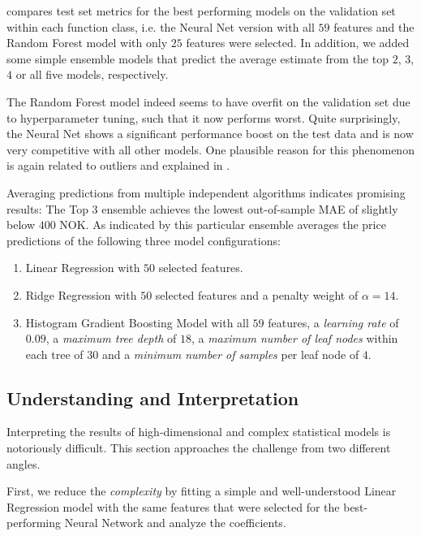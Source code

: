  compares test set metrics for the best performing models on the validation set within each function class, i.e. the Neural Net version with all $59$ features and the Random Forest model with only $25$ features were selected.
In addition, we added some simple ensemble models that predict the average estimate from the top $2$, $3$, $4$ or all five models, respectively.

The Random Forest model indeed seems to have overfit on the validation set due to hyperparameter tuning, such that it now performs worst.
Quite surprisingly, the Neural Net shows a significant performance boost on the test data and is now very competitive with all other models.
One plausible reason for this phenomenon is again related to outliers and explained in .

Averaging predictions from multiple independent algorithms indicates promising results:
The Top $3$ ensemble achieves the lowest out-of-sample MAE of slightly below $400$ NOK.
As indicated by  this particular ensemble averages the price predictions of the following three model configurations:
\begin{enumerate}
  \item Linear Regression with $50$ selected features.
  \item Ridge Regression with $50$ selected features and a penalty weight of $\alpha = 14$.
  \item Histogram Gradient Boosting Model with all $59$ features, a \emph{learning rate} of $0.09$, a \emph{maximum tree depth} of $18$, a \emph{maximum number of leaf nodes} within each tree of $30$ and a \emph{minimum number of samples} per leaf node of $4$.
\end{enumerate}




\subsection{Understanding and Interpretation}

Interpreting the results of high-dimensional and complex statistical models is notoriously difficult.
This section approaches the challenge from two different angles.

First, we reduce the \emph{complexity} by fitting a simple and well-understood Linear Regression model with the same features that were selected for the best-performing Neural Network and analyze the coefficients.

